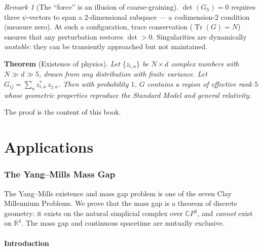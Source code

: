 \documentclass[12pt]{article}
\theoremstyle{remark}
\newtheorem{remark}[theorem]{Remark}
\theoremstyle{definition}
\newcommand{\CP}{\mathbb{C}P}
\newcommand{\RR}{\mathbb{R}}
\begin{document}
\begin{remark}[The ``force'' is an illusion of coarse-graining]
$\det(G_h) = 0$ requires three $\psi$-vectors to span a 2-dimensional subspace --- a codimension-2 condition (measure zero).  At such a configuration, trace conservation ($\operatorname{Tr}(G) = N$) ensures that any perturbation restores $\det > 0$.  Singularities are dynamically \emph{unstable}: they can be transiently approached but not maintained.

\bigskip

\noindent\textbf{Theorem} (Existence of physics). \emph{Let $\{z_{i,a}\}$ be $N \times d$ complex numbers with $N \gg d \gg 5$, drawn from any distribution with finite variance. Let $G_{ij} = \sum_a z^*_{i,a}\,z_{j,a}$. Then with probability $1$, $G$ contains a region of effective rank $5$ whose geometric properties reproduce the Standard Model and general relativity.}

\bigskip

\noindent The proof is the content of this book.



\part{Applications}

\section{The Yang--Mills Mass Gap}
\label{ch:yang_mills}

The Yang--Mills existence and mass gap problem is one of the seven Clay Millennium Problems. We prove that the mass gap is a theorem of discrete geometry: it exists on the natural simplicial complex over $\CP^4$, and \emph{cannot} exist on $\RR^4$. The mass gap and continuous spacetime are mutually exclusive.

\subsection{Introduction}
\label{sec:intro}


\end{remark}
\end{document}
